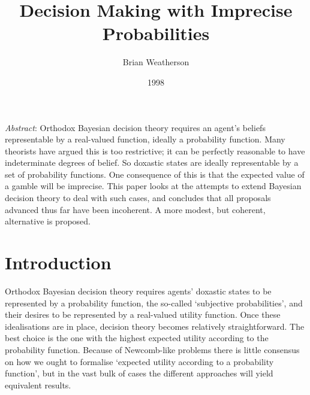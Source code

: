 \documentclass[
  11pt,
  letterpaper,
  DIV=11,
  numbers=noendperiod,
  twoside]{scrartcl}
\title{Decision Making with Imprecise Probabilities}
\author{Brian Weatherson}
\date{1998}
\renewenvironment{abstract}
 {\vspace{-1.25cm}
 \quotation\small\noindent\emph{Abstract}:}
 {\endquotation}
\renewenvironment{abstract}
 {\quotation\small\noindent\emph{Abstract}:}
 {\endquotation\vspace{-0.02cm}}
\begin{document}
\maketitle
\begin{abstract}
Orthodox Bayesian decision theory requires an agent's beliefs
representable by a real-valued function, ideally a probability function.
Many theorists have argued this is too restrictive; it can be perfectly
reasonable to have indeterminate degrees of belief. So doxastic states
are ideally representable by a set of probability functions. One
consequence of this is that the expected value of a gamble will be
imprecise. This paper looks at the attempts to extend Bayesian decision
theory to deal with such cases, and concludes that all proposals
advanced thus far have been incoherent. A more modest, but coherent,
alternative is proposed.
\end{abstract}


\section{Introduction}\label{introduction}

Orthodox Bayesian decision theory requires agents' doxastic states to be
represented by a probability function, the so-called `subjective
probabilities', and their desires to be represented by a real-valued
utility function. Once these idealisations are in place, decision theory
becomes relatively straightforward. The best choice is the one with the
highest expected utility according to the probability function. Because
of Newcomb-like problems there is little consensus on how we ought to
formalise `expected utility according to a probability function', but in
the vast bulk of cases the different approaches will yield equivalent
results.
\end{document}
